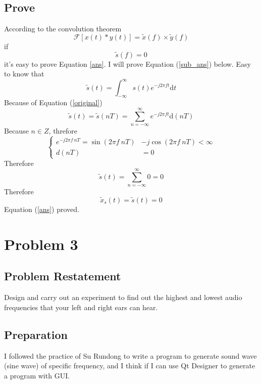 \documentclass{article}
\begin{document}
\subsection{Prove}
According to the convolution theorem
\begin{equation*}
    \mathcal{F}\left[ x(t)*y(t) \right] = \widetilde{x}(f) \times \widetilde{y}(f)
\end{equation*}
if 
\begin{equation}
    \widetilde{s}(f) = 0
    \label{sub_ans}
\end{equation}
it's easy to prove Equation \ref{ans}.
I will prove Equation (\ref{sub_ans}) below. Easy to know that
\begin{equation*}
    \widetilde{s}(t) = \int_{-\infty}^{\infty} s(t) e^{-j2\pi ft} \mathrm{d}t
\end{equation*}
Because of Equation (\ref{original})
$$\widetilde{s}(t) = \widetilde{s}(nT) = \sum_{n = -\infty}^{\infty} e^{-j2\pi ft} \mathrm{d}(nT)$$
Because $n \in Z$, threfore
$$
\left\{
    \begin{array}{rl}
    e^{-j2\pi f~nT} = \sin(2\pi f~nT) &- j\cos(2\pi f~nT) < \infty\\
    d(nT) &= 0
    \end{array}
\right.
$$
Therefore
\begin{equation*}
    \widetilde{s}(t) = \sum_{n = -\infty}^{\infty} 0 = 0
\end{equation*}
Therefore
\begin{equation*}
    \widetilde{x}_s(t) = \widetilde{s}(t) = 0
\end{equation*}
Equation (\ref{ans}) proved.

\section{Problem 3}
\subsection{Problem Restatement}
Design and carry out an experiment to find out the highest and lowest audio frequencies that your left and right ears can
hear.
\subsection{Preparation}
I followed the practice of Su Rundong to write a program to generate sound wave (sine wave) of specific frequency, and I think if I can use Qt Designer to generate a program with GUI.
\end{document}
